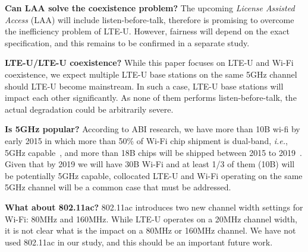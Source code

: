 
\textbf{Can LAA solve the coexistence problem?}
The upcoming \textit{License Assisted Access} (LAA) will include listen-before-talk,
therefore is promising to overcome the inefficiency problem of LTE-U.
However, fairness will depend on the exact specification, and this remains to be confirmed in a separate study. 


\textbf{LTE-U/LTE-U coexistence?} While this paper focuses on 
LTE-U and Wi-Fi coexistence, we expect 
multiple LTE-U base stations on the same 5GHz channel should LTE-U become
mainstream. In such a case, LTE-U base stations  
 will impact each other significantly. 
As none of them performs listen-before-talk, 
the actual degradation could be arbitrarily severe.

\textbf{Is 5GHz popular?}
According to ABI research, we have more than 10B wi-fi by early 2015
in which more than 50\% of Wi-Fi chip shipment is dual-band, \textit{i.e.}, 5GHz capable~\cite{wifimarket1},
and more than 18B chips will be shipped between 2015 to 2019~\cite{wifimarket2}.
Given that by 2019 we will have 30B Wi-Fi and at least 1/3 of them (10B) will be potentially 5GHz capable,
collocated LTE-U and Wi-Fi operating on the same 5GHz channel will be a common case that must be addressed.

\textbf{What about 802.11ac?}
802.11ac introduces two new channel width settings for Wi-Fi: 80MHz and 160MHz. While LTE-U operates on a 20MHz channel width, it is not clear what is the impact on a 80MHz or 160MHz channel. We have not used 802.11ac in our study, and this should be an important future work.
